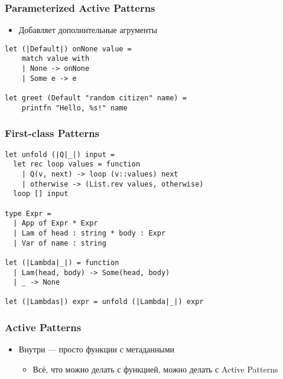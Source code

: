 \documentclass[xetex,mathserif,serif]{beamer}
\begin{document}
    \begin{frame}[fragile]
        \frametitle{Parameterized Active Patterns}

        \begin{itemize}
            \item Добавляет дополнительные агрументы
        \end{itemize}

        \begin{verbatim}
let (|Default|) onNone value =
    match value with
    | None -> onNone
    | Some e -> e

let greet (Default "random citizen" name) =
    printfn "Hello, %s!" name
        \end{verbatim}

    \end{frame}

    \begin{frame}[fragile]
        \frametitle{First-class Patterns}

        \begin{verbatim}
let unfold (|Q|_|) input =
  let rec loop values = function
    | Q(v, next) -> loop (v::values) next
    | otherwise -> (List.rev values, otherwise)
  loop [] input

type Expr =
  | App of Expr * Expr
  | Lam of head : string * body : Expr
  | Var of name : string

let (|Lambda|_|) = function
  | Lam(head, body) -> Some(head, body)
  | _ -> None

let (|Lambdas|) expr = unfold (|Lambda|_|) expr
        \end{verbatim}

    \end{frame}

    \begin{frame}[fragile]
        \frametitle{Active Patterns}

        \begin{itemize}
            \item Внутри --- просто функции с метаданными
            \begin{itemize}
                \item Всё, что можно делать с функцией, можно делать с Active Patterns
            \end{itemize}
        \end{itemize}
        \begin{verbatim}
        \end{verbatim}
    \end{frame}
\end{document}
